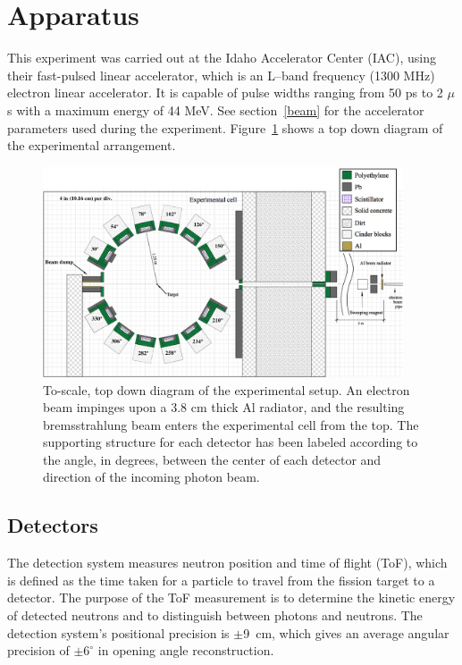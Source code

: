 \section{Apparatus}
This experiment was carried out at the Idaho Accelerator Center (IAC), using their fast-pulsed linear accelerator, which is an L--band frequency (1300 MHz) electron linear accelerator.
It is capable of pulse widths ranging from 50 ps to 2 $\mu$s with a maximum energy of 44 MeV.
See section~\ref{beam} for the accelerator parameters used during the experiment.
Figure~\ref{fig:Facility} shows a top down diagram of the experimental arrangement.

\begin{figure}[h]
\centering
\includegraphics[width=0.95\textwidth]{Content/Methods/ExpArangment.jpg}
\caption{To-scale, top down diagram of the experimental setup.
An electron beam impinges upon a 3.8 cm thick Al radiator, and the resulting bremsstrahlung beam enters the experimental cell from the top.
The supporting structure for each detector has been labeled according to the angle, in degrees, between the center of each detector and direction of the incoming photon beam.
}
\label{fig:Facility}
\end{figure}
\subsection{Detectors}
\label{subsection:detectors}
The detection system measures neutron position and time of flight (ToF), which is defined as the time taken for a particle to travel from the fission target to a detector.
The purpose of the ToF measurement is to determine the kinetic energy of detected neutrons and to distinguish between photons and neutrons.
The detection system's positional precision is $\pm$9~cm, which gives an average angular precision of $\pm6^{\circ}$ in opening angle reconstruction.

